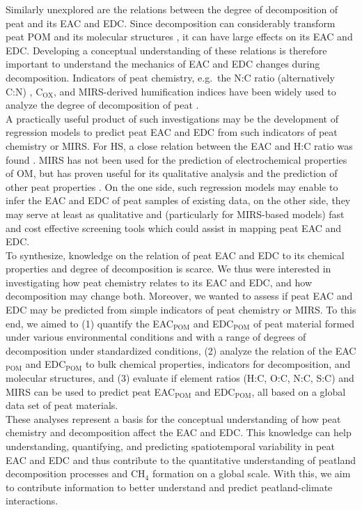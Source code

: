\documentclass[alpha-refs]{wiley-article-rmd}
\begin{document}
\begin{refsection}
Similarly unexplored are the relations between the degree of decomposition of peat and its EAC and EDC. Since decomposition can considerably transform peat POM and its molecular structures \autocite{Cocozza.2003}, it can have large effects on its EAC and EDC. Developing a conceptual understanding of these relations is therefore important to understand the mechanics of EAC and EDC changes during decomposition. Indicators of peat chemistry, e.g.~the N:C ratio (alternatively C:N) \autocite{Biester.2014}, C\(_\text{OX}\), and MIRS-derived humification indices \autocite{Broder.2012} have been widely used to analyze the degree of decomposition of peat \autocite{Biester.2014,Drollinger.2020}.\\
A practically useful product of such investigations may be the development of regression models to predict peat EAC and EDC from such indicators of peat chemistry or MIRS. For HS, a close relation between the EAC and H:C ratio was found \autocite{Aeschbacher.2010,Tan.2017}. MIRS has not been used for the prediction of electrochemical properties of OM, but has proven useful for its qualitative analysis \autocite{HernandezMontoya.2012,Yuan.2018} and the prediction of other peat properties \autocite{Hodgkins.2018,Artz.2008}.
On the one side, such regression models may enable to infer the EAC and EDC of peat samples of existing data, on the other side, they may serve at least as qualitative and (particularly for MIRS-based models) fast and cost effective screening tools which could assist in mapping peat EAC and EDC.\\
To synthesize, knowledge on the relation of peat EAC and EDC to its chemical properties and degree of decomposition is scarce. We thus were interested in investigating how peat chemistry relates to its EAC and EDC, and how decomposition may change both. Moreover, we wanted to assess if peat EAC and EDC may be predicted from simple indicators of peat chemistry or MIRS.
To this end, we aimed to (1) quantify the EAC\(_\text{POM}\) and EDC\(_\text{POM}\) of peat material formed under various environmental conditions and with a range of degrees of decomposition under standardized conditions, (2) analyze the relation of the EAC\(_\text{POM}\) and EDC\(_\text{POM}\) to bulk chemical properties, indicators for decomposition, and molecular structures, and (3) evaluate if element ratios (H:C, O:C, N:C, S:C) and MIRS can be used to predict peat EAC\(_\text{POM}\) and EDC\(_\text{POM}\), all based on a global data set of peat materials.\\
These analyses represent a basis for the conceptual understanding of how peat chemistry and decomposition affect the EAC and EDC. This knowledge can help understanding, quantifying, and predicting spatiotemporal variability in peat EAC and EDC and thus contribute to the quantitative understanding of peatland decomposition processes and CH\(_4\) formation on a global scale. With this, we aim to contribute information to better understand and predict peatland-climate interactions.


\end{refsection}
\end{document}
